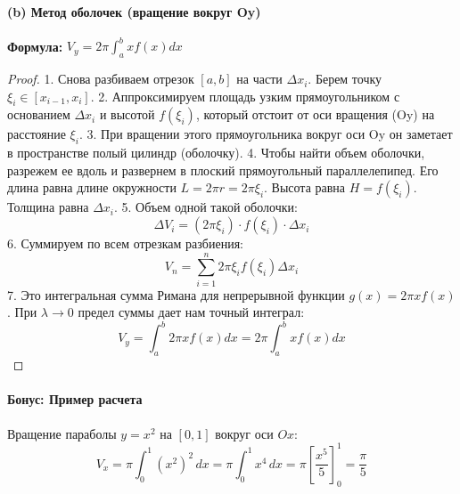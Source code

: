 \paragraph{(b) Метод оболочек (вращение вокруг Oy)}
\begin{center}
\end{center}

\textbf{Формула:} $V_y = 2\pi \int_a^b x f(x) dx$

\begin{proof}
1. Снова разбиваем отрезок $[a, b]$ на части $\Delta x_i$. Берем точку $\xi_i \in [x_{i-1}, x_i]$.
2. Аппроксимируем площадь узким прямоугольником с основанием $\Delta x_i$ и высотой $f(\xi_i)$, который отстоит от оси вращения (Oy) на расстояние $\xi_i$.
3. При вращении этого прямоугольника вокруг оси Oy он заметает в пространстве полый цилиндр (оболочку).
4. Чтобы найти объем оболочки, разрежем ее вдоль и развернем в плоский прямоугольный параллелепипед. 
   Его длина равна длине окружности $L = 2\pi r = 2\pi \xi_i$. 
   Высота равна $H = f(\xi_i)$. 
   Толщина равна $\Delta x_i$.
5. Объем одной такой оболочки:
$$\Delta V_i = (2\pi \xi_i) \cdot f(\xi_i) \cdot \Delta x_i$$
6. Суммируем по всем отрезкам разбиения:
$$V_n = \sum_{i=1}^n 2\pi \xi_i f(\xi_i) \Delta x_i$$
7. Это интегральная сумма Римана для непрерывной функции $g(x) = 2\pi x f(x)$. При $\lambda \to 0$ предел суммы дает нам точный интеграл:
$$V_y = \int_a^b 2\pi x f(x) dx = 2\pi \int_a^b x f(x) dx$$
\end{proof}

\paragraph{Бонус: Пример расчета}
Вращение параболы $y = x^2$ на $[0, 1]$ вокруг оси $Ox$:
$$V_x = \pi \int_0^1 (x^2)^2 \, dx = \pi \int_0^1 x^4 \, dx = \pi \left[ \frac{x^5}{5} \right]_0^1 = \frac{\pi}{5}$$


